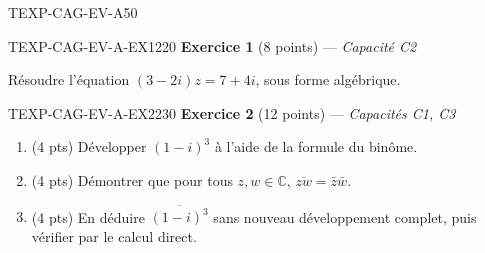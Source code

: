 

\begin{evaluation}{TEXP-CAG-EV-A}{50}

\begin{exercice}{TEXP-CAG-EV-A-EX1}{2}{20}
\textbf{Exercice 1} (8 points) --- \textit{Capacité C2}

\medskip

Résoudre l'équation $(3-2i)z = 7+4i$, sous forme algébrique.
\end{exercice}

\begin{exercice}{TEXP-CAG-EV-A-EX2}{2}{30}
\textbf{Exercice 2} (12 points) --- \textit{Capacités C1, C3}

\medskip

\begin{enumerate}
  \item (4 pts) Développer $(1-i)^3$ à l'aide de la formule du binôme.
  \item (4 pts) Démontrer que pour tous $z,w\in\mathbb{C}$, $\overline{zw}=\bar z\bar w$.
  \item (4 pts) En déduire $\overline{(1-i)^3}$ sans nouveau développement complet, puis vérifier par le calcul direct.
\end{enumerate}
\end{exercice}

\end{evaluation}
